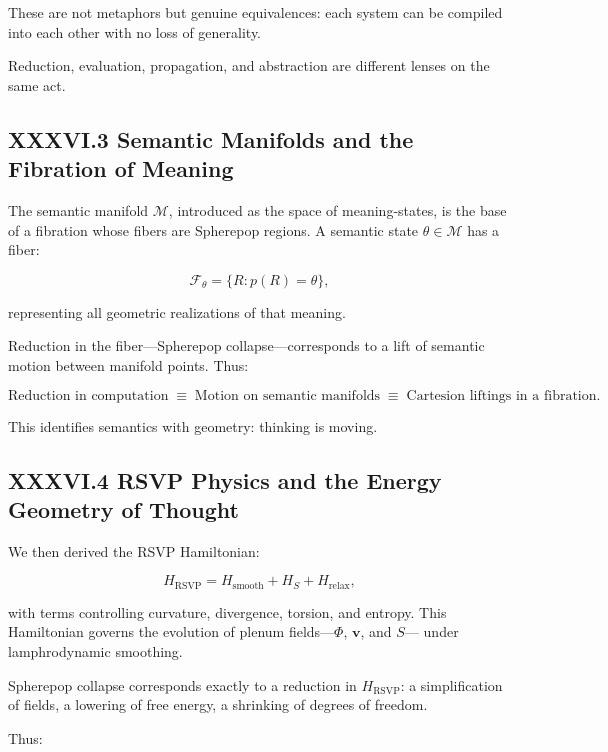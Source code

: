 \documentclass[11pt,letterpaper]{article}
\begin{document}
These are not metaphors but genuine equivalences:
each system can be compiled into each other with no loss of generality.

Reduction, evaluation, propagation, and abstraction are 
different lenses on the same act.

\subsection{XXXVI.3 Semantic Manifolds and the Fibration of Meaning}

The semantic manifold $\mathcal{M}$, introduced as the space of meaning-states,
is the base of a fibration whose fibers are Spherepop regions.  
A semantic state $\theta \in \mathcal{M}$ has a fiber:

\[
\mathcal{F}_\theta = \{ R : p(R) = \theta \},
\]

representing all geometric realizations of that meaning.

Reduction in the fiber—Spherepop collapse—corresponds to a lift of semantic motion 
between manifold points.  
Thus:

\[
\text{Reduction in computation}
\;\equiv\;
\text{Motion on semantic manifolds}
\;\equiv\;
\text{Cartesion liftings in a fibration}.
\]

This identifies semantics with geometry:  
thinking is moving.

\subsection{XXXVI.4 RSVP Physics and the Energy Geometry of Thought}

We then derived the RSVP Hamiltonian:

\[
H_{\text{RSVP}}
= H_{\text{smooth}}
+ H_S
+ H_{\text{relax}},
\]

with terms controlling curvature, divergence, torsion, and entropy.  
This Hamiltonian governs the evolution of plenum fields—$\Phi$, $\mathbf{v}$, and $S$—
under lamphrodynamic smoothing.

Spherepop collapse corresponds exactly to a reduction in $H_{\text{RSVP}}$:
a simplification of fields,
a lowering of free energy,
a shrinking of degrees of freedom.

Thus:
\end{document}
